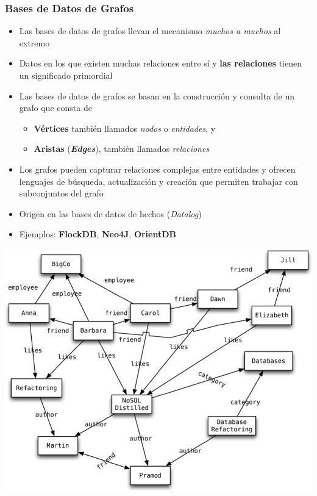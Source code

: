 \documentclass[14pt]{beamer}
\begin{document}
\begin{frame}[allowframebreaks]
  \frametitle{Bases de Datos de Grafos}
\vspace*{-1ex}
  \begin{itemize}
  \item Las bases de datos de grafos llevan el mecanismo {\em muchos a
      muchos} al extremo
  \item Datos en los que existen muchas relaciones entre sí y {\bf las
      relaciones} tienen un significado primordial
\item Las bases de datos de grafos se basan en la construcción y consulta
  de un grafo que consta de
  \begin{itemize}
  \item {\bf Vértices} también llamados {\em nodos} o {\em entidades}, y
  \item {\bf Aristas} ({\bfseries\itshape Edges}), también llamados {\em
      relaciones}
  \end{itemize}
\item Los grafos pueden capturar relaciones complejas entre
  entidades y ofrecen lenguajes de búsqueda, actualización y creación que
  permiten trabajar con subconjuntos del grafo
\item Origen en las bases de datos de hechos ({\em Datalog\/})
\item Ejemplos: {\bf FlockDB}, {\bf Neo4J}, {\bf OrientDB}
\end{itemize}
\end{frame}

\begin{frame}[plain]
\includegraphics[width=\textwidth]{img/graph}
\end{frame}
\end{document}
